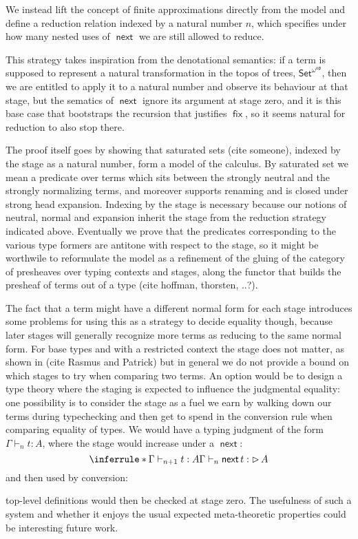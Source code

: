 \documentclass{book}
\DeclareMathOperator{\fix}{\mathsf{fix}}
\DeclareMathOperator{\Later}{\vartriangleright}
\DeclareMathOperator{\next}{\ensuremath{\mathsf{next}}}
\begin{document}
  We instead lift the concept of finite approximations directly from
  the model and define a reduction relation indexed by a natural
  number $n$, which specifies under how many nested uses of $\next$ we
  are still allowed to reduce.

  This strategy takes inspiration from the denotational semantics: if
  a term is supposed to represent a natural transformation in the
  topos of trees, $\mathsf{Set}^{\omega^\mathsf{op}}$, then we are
  entitled to apply it to a natural number and observe its behaviour
  at that stage, but the sematics of $\next$ ignore its argument at
  stage zero, and it is this base case that bootstraps the recursion
  that justifies $\fix$, so it seems natural for reduction to also
  stop there.

  The proof itself goes by showing that saturated sets (cite someone),
  indexed by the stage as a natural number, form a model of the
  calculus. By saturated set we mean a predicate over terms which sits
  between the strongly neutral and the strongly normalizing terms, and
  moreover supports renaming and is closed under strong head
  expansion. Indexing by the stage is necessary because our notions
  of neutral, normal and expansion inherit the stage from the
  reduction strategy indicated above.
  Eventually we prove that the predicates corresponding to the various
  type formers are antitone with respect to the stage, so it might be
  worthwile to reformulate the model as a refinement of the gluing of
  the category of presheaves over typing contexts and stages, along the functor that
  builds the presheaf of terms out of a type (cite hoffman, thorsten, ..?).

  The fact that a term might have a different normal form for each
  stage introduces some problems for using this as a strategy to
  decide equality though, because later stages will generally
  recognize more terms as reducing to the same normal form.
  For base types and with a restricted context the stage does not
  matter, as shown in (cite Rasmus and Patrick) but in general we do
  not provide a bound on which stages to try when comparing two terms.
  An option would be to design a type theory where the staging is expected
  to influence the judgmental equality: one possibility is to consider
  the stage as a fuel we earn by walking down our terms during
  typechecking and then get to spend in the conversion rule when
  comparing equality of types.
  We would have a typing judgment of the form $\Gamma \vdash_n t : A$, where the stage would increase under a $\next$:
  \[
  \inferrule*{\Gamma \vdash_{n+1} t : A}
             {\Gamma \vdash_n \next t : \Later A}
  \]
  and then used by conversion:
  top-level definitions would then be checked at stage zero. The
  usefulness of such a system and whether it enjoys the usual expected
  meta-theoretic properties could be interesting future work.
\end{document}
